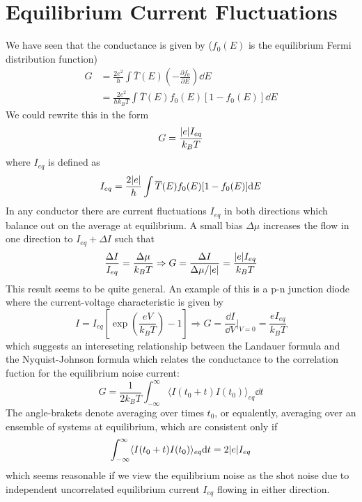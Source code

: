 \documentclass[11pt,a4paper]{book}
\theoremstyle{plain}
\theoremstyle{definition}
\theoremstyle{remark}
\begin{document}
\section{Equilibrium Current Fluctuations}
We have seen that the conductance is given by ($f_0(E)$ is the equilibrium Fermi distribution function)
\begin{equation}
    \begin{aligned}
        G 
        & = \frac{2 e^2}{h} \int \overline{T}(E) \left( -\frac{\partial f_0}{\partial E} \right) \dd E \\
        & = \frac{2 e^2}{h k_B T} \int \overline{T}(E) f_0(E) [1-f_0(E)] \dd E
    \end{aligned}
\end{equation}
We could rewrite this in the form
\begin{equation}
    G = \frac{\abs{e} I_{eq}}{k_B T}
\end{equation}
where $I_{eq}$ is defined as
\begin{equation}
    I_{eq} = \frac{2\abs{e}}{h} \int \overline{T}(E) f_0(E) [1-f_0(E)] \dd E
\end{equation}
In any conductor there are current fluctuations $I_{eq}$ in both directions which balance out on the average at equilibrium. A small bias $\Delta \mu$ increases the flow in one direction to $I_{eq} + \Delta I$ such that
\begin{equation}
    \frac{\Delta I}{I_{eq}} = \frac{\Delta \mu}{k_B T} \Rightarrow G = \frac{\Delta I}{\Delta \mu / \abs{e}} = \frac{\abs{e} I_{eq}}{k_B T}
\end{equation}
This result seems to be quite general. An example of this is a p-n junction diode where the current-voltage characteristic is given by
\begin{equation}
    I = I_{eq}\left[ \exp \left( \frac{e V}{k_B T} \right) - 1 \right] \Rightarrow G = \frac{\dd I}{\dd V}\Bigg|_{V=0} = \frac{e I_{eq}}{k_B T}
\end{equation}
which suggests an intereseting relationship between the Landauer formula and the Nyquist-Johnson formula which relates the conductance to the correlation fuction for the equilibrium noise current:
\begin{equation}
    G = \frac{1}{2 k_B T} \int_{-\infty}^{\infty} \langle I(t_0+t) I(t_0) \rangle_{eq} \dd t
\end{equation}
The angle-brakets denote averaging over times $t_0$, or equalently, averaging over an ensemble of systems at equilibrium, which are consistent only if
\begin{equation}
    \int^{\infty}_{-\infty} \langle I(t_0+t) I(t_0) \rangle_{eq} \dd t = 2 \abs{e} I_{eq}
\end{equation}
which seems reasonable if we view the equilibrium noise as the shot noise due to independent uncorrelated equilibrium current $I_{eq}$ flowing in either direction.
\end{document}
